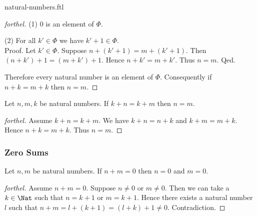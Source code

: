 \documentclass{naproche-library}
\begin{document}
\begin{smodule}{natural-numbers.ftl}
\begin{proof}[forthel]
    (1) $0$ is an element of $\Phi$.

    (2) For all $k' \in \Phi$ we have $k' + 1 \in \Phi$. \\
    Proof.
      Let $k' \in \Phi$.
      Suppose $n + (k' + 1) = m + (k' + 1)$.
      Then $(n + k') + 1 = (m + k') + 1$.
      Hence $n + k' = m + k'$.
      Thus $n = m$.
    Qed.

    Therefore every natural number is an element of $\Phi$.
    Consequently if $n + k = m + k$ then $n = m$.
  \end{proof}

  \begin{corollary}[forthel,id=ARITHMETIC_03_8445946379632640,printid]
    Let $n, m, k$ be natural numbers.
    If $k + n = k + m$ then $n = m$.
  \end{corollary}
  \begin{proof}[forthel]
    Assume $k + n = k + m$.
    We have $k + n = n + k$ and $k + m = m + k$.
    Hence $n + k = m + k$.
    Thus $n = m$.
  \end{proof}


  \subsubsection*{Zero Sums}

  \begin{proposition}[forthel,id=ARITHMETIC_03_3520602170195968,printid]
    Let $n, m$ be natural numbers.
    If $n + m = 0$ then $n = 0$ and $m = 0$.
  \end{proposition}
  \begin{proof}[forthel]
    Assume $n + m = 0$.
    Suppose $n \neq 0$ or $m \neq 0$.
    Then we can take a $k \in \Nat$ such that $n = k + 1$ or $m = k + 1$.
    Hence there exists a natural number $l$ such that
    $n + m
      = l + (k + 1)
      = (l + k) + 1
      \neq 0$.
    Contradiction.
  \end{proof}
\end{smodule}
\end{document}
